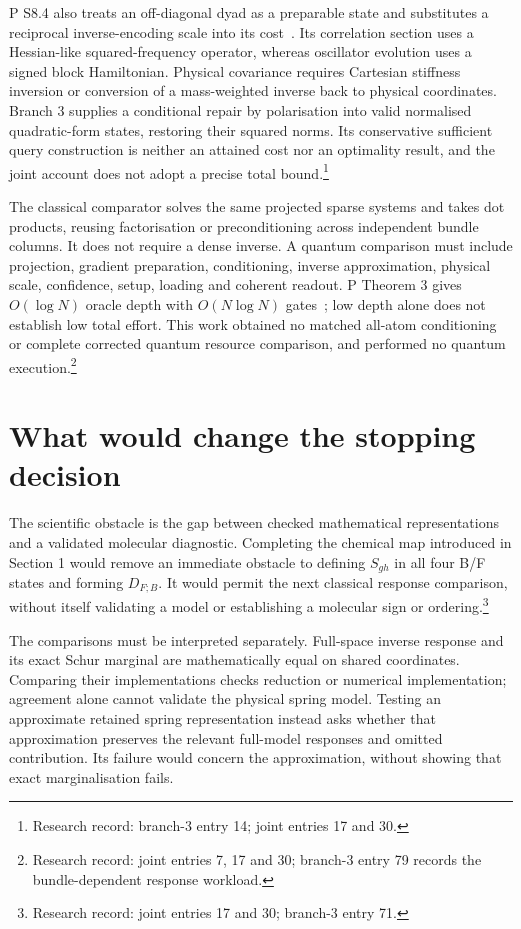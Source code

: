 \documentclass{article}
\begin{document}
P S8.4 also treats an off-diagonal dyad as a preparable state and substitutes a reciprocal inverse-encoding scale into its cost~\cite{P}. Its correlation section uses a Hessian-like squared-frequency operator, whereas oscillator evolution uses a signed block Hamiltonian. Physical covariance requires Cartesian stiffness inversion or conversion of a mass-weighted inverse back to physical coordinates. Branch 3 supplies a conditional repair by polarisation into valid normalised quadratic-form states, restoring their squared norms. Its conservative sufficient query construction is neither an attained cost nor an optimality result, and the joint account does not adopt a precise total bound.\footnote{Research record: branch-3 entry 14; joint entries 17 and 30.}

The classical comparator solves the same projected sparse systems and takes dot products, reusing factorisation or preconditioning across independent bundle columns. It does not require a dense inverse. A quantum comparison must include projection, gradient preparation, conditioning, inverse approximation, physical scale, confidence, setup, loading and coherent readout. P Theorem 3 gives \(O(\log N)\) oracle depth with \(O(N\log N)\) gates~\cite{P}; low depth alone does not establish low total effort. This work obtained no matched all-atom conditioning or complete corrected quantum resource comparison, and performed no quantum execution.\footnote{Research record: joint entries 7, 17 and 30; branch-3 entry 79 records the bundle-dependent response workload.}

\section{What would change the stopping decision}
The scientific obstacle is the gap between checked mathematical representations and a validated molecular diagnostic. Completing the chemical map introduced in Section 1 would remove an immediate obstacle to defining \(S_{gh}\) in all four B/F states and forming \(D_{F;B}\). It would permit the next classical response comparison, without itself validating a model or establishing a molecular sign or ordering.\footnote{Research record: joint entries 17 and 30; branch-3 entry 71.}

The comparisons must be interpreted separately. Full-space inverse response and its exact Schur marginal are mathematically equal on shared coordinates. Comparing their implementations checks reduction or numerical implementation; agreement alone cannot validate the physical spring model. Testing an approximate retained spring representation instead asks whether that approximation preserves the relevant full-model responses and omitted contribution. Its failure would concern the approximation, without showing that exact marginalisation fails.
\end{document}
